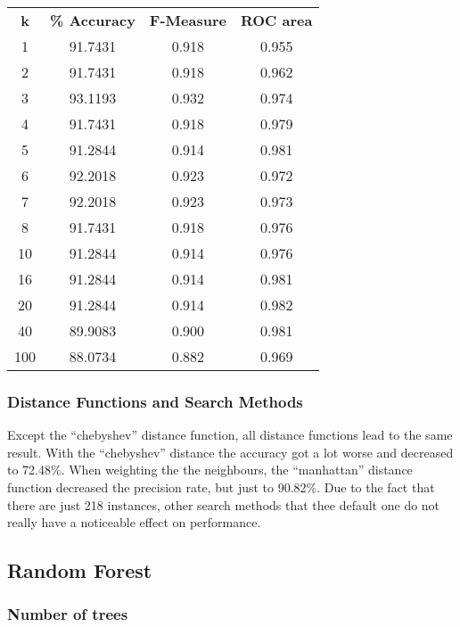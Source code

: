\documentclass{article}
\begin{document}
 \begin{center}
\begin{tabular}{ c | c | c | c }
\textbf{k} & \textbf{\% Accuracy} & \textbf{F-Measure} & \textbf{ROC area} \\
1 & 91.7431 & 0.918 & 0.955 \\
2 & 91.7431 & 0.918 & 0.962 \\
3 & 93.1193 & 0.932 & 0.974 \\
4 & 91.7431 & 0.918 & 0.979 \\
5 & 91.2844 & 0.914 & 0.981 \\
6 & 92.2018 & 0.923 & 0.972 \\
7 & 92.2018 & 0.923 & 0.973 \\
8 & 91.7431 & 0.918 & 0.976 \\
10 & 91.2844 & 0.914 & 0.976 \\
16 & 91.2844 & 0.914 & 0.981 \\
20 & 91.2844 & 0.914 & 0.982 \\
40 & 89.9083 & 0.900 & 0.981 \\
100 & 88.0734 & 0.882 & 0.969 \\
\end{tabular}
\end{center}
 
\subsubsection{Distance Functions and Search Methods}
 
Except the “chebyshev” distance function, all distance functions lead to the same result. With the “chebyshev” distance the accuracy got a lot worse and decreased to 72.48\%. When weighting the the neighbours, the “manhattan” distance function decreased the precision rate, but just to 90.82\%. Due to the fact that there are just 218 instances, other search methods that thee default one do not really have a noticeable effect on performance.
 
\subsection{Random Forest}
 
\subsubsection{Number of trees}
 
\end{document}
